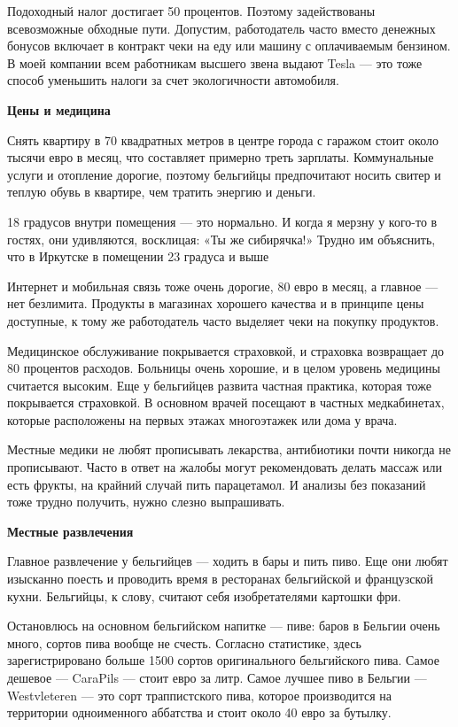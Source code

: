 Подоходный налог достигает 50 процентов. Поэтому задействованы всевозможные обходные пути. Допустим, работодатель часто вместо денежных бонусов включает в контракт чеки на еду или машину с оплачиваемым бензином. В моей компании всем работникам высшего звена выдают Tesla — это тоже способ уменьшить налоги за счет экологичности автомобиля.

\textbf{Цены и медицина}

Снять квартиру в 70 квадратных метров в центре города с гаражом стоит около тысячи евро в месяц, что составляет примерно треть зарплаты. Коммунальные услуги и отопление дорогие, поэтому бельгийцы предпочитают носить свитер и теплую обувь в квартире, чем тратить энергию и деньги.

\begin{fancyquotes}
    18 градусов внутри помещения — это нормально. И когда я мерзну у кого-то в гостях, они удивляются, восклицая: «Ты же сибирячка!» Трудно им объяснить, что в Иркутске в помещении 23 градуса и выше
\end{fancyquotes}

Интернет и мобильная связь тоже очень дорогие, 80 евро в месяц, а главное — нет безлимита. Продукты в магазинах хорошего качества и в принципе цены доступные, к тому же работодатель часто выделяет чеки на покупку продуктов.

Медицинское обслуживание покрывается страховкой, и страховка возвращает до 80 процентов расходов. Больницы очень хорошие, и в целом уровень медицины считается высоким. Еще у бельгийцев развита частная практика, которая тоже покрывается страховкой. В основном врачей посещают в частных медкабинетах, которые расположены на первых этажах многоэтажек или дома у врача.

Местные медики не любят прописывать лекарства, антибиотики почти никогда не прописывают. Часто в ответ на жалобы могут рекомендовать делать массаж или есть фрукты, на крайний случай пить парацетамол. И анализы без показаний тоже трудно получить, нужно слезно выпрашивать.

\textbf{Местные развлечения}

Главное развлечение у бельгийцев — ходить в бары и пить пиво. Еще они любят изысканно поесть и проводить время в ресторанах бельгийской и французской кухни. Бельгийцы, к слову, считают себя изобретателями картошки фри.

Остановлюсь на основном бельгийском напитке — пиве: баров в Бельгии очень много, сортов пива вообще не счесть. Согласно статистике, здесь зарегистрировано больше 1500 сортов оригинального бельгийского пива. Самое дешевое — CaraPils — стоит евро за литр. Самое лучшее пиво в Бельгии — Westvleteren — это сорт траппистского пива, которое производится на территории одноименного аббатства и стоит около 40 евро за бутылку.


